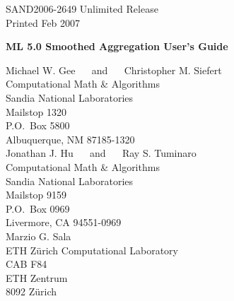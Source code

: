 \documentclass{article}[11pt]
\def\draft{%
\special{!userdict begin /bop-hook{gsave
200 30 translate 65 rotate
/Times-Roman findfont 216 scalefont setfont
0 0 moveto 0.9 setgray (DRAFT) show grestore}def end}
}
\begin{document}

\setcounter{page}{3}

\large


%
%
\begin{center}
SAND2006-2649
Unlimited Release \\
Printed Feb 2007
\end{center}

\vspace{0.2in}

\begin{center}
{\Large {\bf ML 5.0 Smoothed Aggregation User's Guide}}

\vspace*{0.8in}
Michael W. Gee $\quad$ and $\quad$
Christopher M. Siefert \\
Computational Math \& Algorithms \\
Sandia National Laboratories\\
Mailstop 1320 \\
P.O.~Box 5800 \\
Albuquerque, NM 87185-1320\\[10pt]
Jonathan J. Hu $\quad$ and $\quad$
Ray S. Tuminaro \\
Computational Math \& Algorithms \\
Sandia National Laboratories\\
Mailstop 9159 \\
P.O.~Box 0969 \\
Livermore, CA 94551-0969\\[10pt]
Marzio G. Sala \\
ETH Z\"urich Computational Laboratory\\
CAB F84\\
ETH Zentrum\\
8092 Z\"urich\\


\vspace*{1in}

\end{center}
\end{document}
